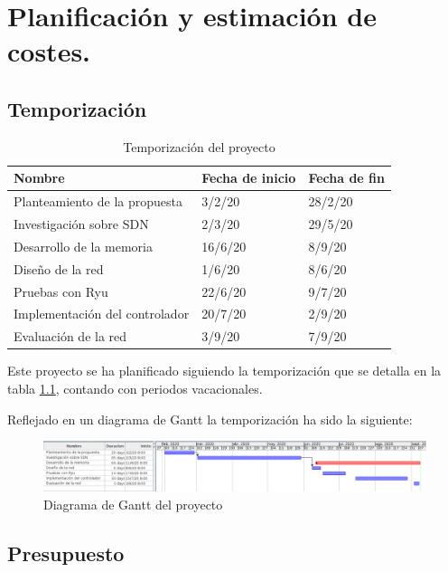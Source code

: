 \chapter{Planificación y estimación de costes.}

\section{Temporización}

\begin{table}[!h]
\centering
\begin{tabular}{|l|l|l|}
\hline
Nombre & Fecha de inicio & Fecha de fin \\ \hline
Planteamiento de la propuesta & 3/2/20 & 28/2/20 \\ \hline
Investigación sobre SDN & 2/3/20 & 29/5/20 \\ \hline
Desarrollo de la memoria & 16/6/20 & 8/9/20 \\ \hline
Diseño de la red & 1/6/20 & 8/6/20 \\ \hline
Pruebas con Ryu & 22/6/20 & 9/7/20 \\ \hline
Implementación del controlador & 20/7/20 & 2/9/20 \\ \hline
Evaluación de la red & 3/9/20 & 7/9/20 \\ \hline
\end{tabular}
\label{tab:temporizacion}
\caption{Temporización del proyecto}
\end{table}

Este proyecto se ha planificado siguiendo la temporización que se detalla en la tabla \ref{tab:temporizacion}, contando con periodos vacacionales.

Reflejado en un diagrama de Gantt la temporización ha sido la siguiente:

\begin{figure}[!h]
    \centering
    \includegraphics[width=1.2\textwidth]{imagenes/figuras/temporizacion.png}
    \caption{Diagrama de Gantt del proyecto}
    \label{fig:temporizacion}
\end{figure}

\section{Presupuesto}

